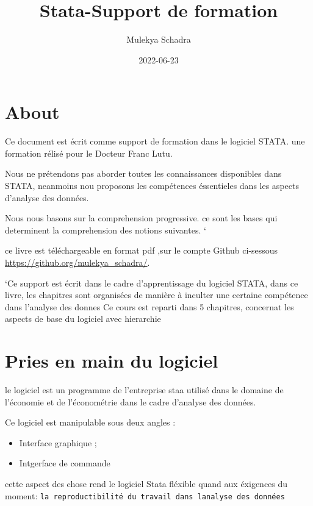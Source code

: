 \documentclass[
]{book}
\title{Stata-Support de formation}
\author{Mulekya Schadra}
\date{2022-06-23}
\providecommand{\tightlist}{%
  \setlength{\itemsep}{0pt}\setlength{\parskip}{0pt}}
\begin{document}
\maketitle

{
\setcounter{tocdepth}{1}
\tableofcontents
}
\hypertarget{about}{%
\chapter*{About}\label{about}}

Ce document est écrit comme support de formation dans le logiciel STATA. une formation rélisé pour le Docteur Franc Lutu.

Nous ne prétendons pas aborder toutes les connaissances disponibles dans STATA,
neanmoins nou proposons les compétences éssentieles dans les aspects d'analyse des données.

Nous nous basons sur la comprehension progressive. ce sont les bases qui determinent la comprehension des notions suivantes. `

ce livre est téléchargeable en format pdf ,sur le compte Github ci-sessous \url{https://github.org/mulekya_schadra/}.

`Ce support est écrit dans le cadre d'apprentissage du logiciel STATA, dans ce livre, les chapitres sont organisées de manière à inculter une certaine compétence dans l'analyse des donnes
Ce cours est reparti dans 5 chapitres, concernat les aspects de base du logiciel avec hierarchie

\hypertarget{pries-en-main-du-logiciel}{%
\chapter{Pries en main du logiciel}\label{pries-en-main-du-logiciel}}

le logiciel est un programme de l'entreprise staa utilisé dans le domaine de l'économie et de l'économétrie dans le cadre d'analyse des données.

Ce logiciel est manipulable sous deux angles :

\begin{itemize}
\tightlist
\item
  Interface graphique ;
\item
  Intgerface de commande
\end{itemize}

cette aspect des chose rend le logiciel Stata fléxible quand aux éxigences du moment: \texttt{la\ reproductibilité\ du\ travail\ dans\ l\textquotesingle{}analyse\ des\ données}
\end{document}
